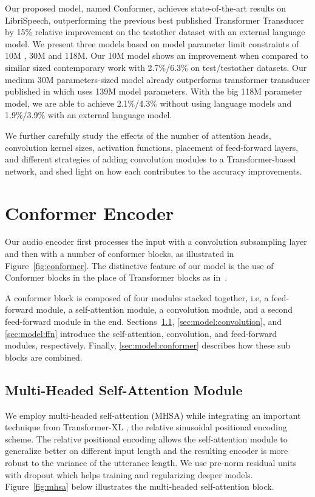 Our proposed model, named Conformer, achieves state-of-the-art results on LibriSpeech, outperforming the previous best published Transformer Transducer \cite{zhang2020transformer} by 15\% relative improvement on the testother dataset with an external language model. We present three models based on model parameter limit constraints of 10M , 30M and 118M. Our 10M model shows an improvement when compared to similar sized contemporary work \cite{han2020contextnet} with 2.7\%/6.3\% on test/testother datasets. Our medium 30M parameters-sized model already outperforms  transformer transducer published in  \cite{zhang2020transformer} which uses 139M model parameters. With the big 118M parameter model, we are able to achieve 2.1\%/4.3\% without using language models and 1.9\%/3.9\% with an external language model.

We further carefully study the effects of the number of attention heads, convolution kernel sizes, activation functions, placement of feed-forward layers, and different strategies of adding convolution modules to a Transformer-based network, and shed light on how each contributes to the accuracy improvements.

\section{Conformer Encoder}

Our audio encoder first processes the input with a convolution subsampling layer and then with a number of conformer blocks, as illustrated in Figure~\ref{fig:conformer}. The distinctive feature of our model is the use of Conformer blocks in the place of Transformer blocks as in~\cite{zhang2020transformer, karita2019comparative}.

A conformer block is composed of four modules stacked together, i.e, a feed-forward module, a self-attention module, a convolution module, and a second feed-forward module in the end. 
Sections~\ref{sec:model:atten}, \ref{sec:model:convolution}, and \ref{sec:model:ffn} introduce the self-attention,  convolution, and feed-forward modules, respectively. Finally, \ref{sec:model:conformer} describes how these sub blocks are combined.

\subsection{Multi-Headed Self-Attention Module}
\label{sec:model:atten}

We employ multi-headed self-attention (MHSA) while integrating an important technique from Transformer-XL \cite{dai2019transformerxl}, the relative sinusoidal positional encoding scheme. The relative positional encoding allows the self-attention module to generalize better on different input length and the resulting encoder is more robust to the variance of the utterance length. We use pre-norm residual units~\cite{wang-etal-2019-learning-deep, nguyen2019transformers} with dropout which helps training and regularizing deeper models. Figure~\ref{fig:mhsa} below illustrates the multi-headed self-attention block.

